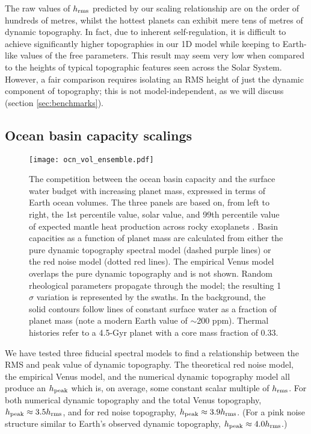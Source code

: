 The raw values of $h_{\rm rms}$ predicted by our scaling relationship are on the order of hundreds of metres, whilst the hottest planets can exhibit mere tens of metres of dynamic topography. In fact, due to inherent self-regulation, it is difficult to achieve significantly higher topographies in our 1D model while keeping to Earth-like values of the free parameters. This result may seem very low when compared to the heights of typical topographic features seen across the Solar System. However, a fair comparison requires isolating an RMS height of just the dynamic component of topography; this is not model-independent, as we will discuss (section \ref{sec:benchmarks}). 




\subsection{Ocean basin capacity scalings}
\label{sec:results-ocean}

\begin{figure}
    \centering
    \texttt{[image: ocn\_vol\_ensemble.pdf]}
    \caption[The competition between the ocean basin capacity and the surface water budget with increasing planet mass.]{The competition between the ocean basin capacity and the surface water budget with increasing planet mass, expressed in terms of Earth ocean volumes. The three panels are based on, from left to right, the 1st percentile value, solar value, and 99th percentile value of expected mantle heat production across rocky exoplanets \citep{nimmo_radiogenic_2020}. Basin capacities as a function of planet mass are calculated from either the pure dynamic topography spectral model (dashed purple lines) or the red noise model (dotted red lines). The empirical Venus model overlaps the pure dynamic topography and is not shown. Random rheological parameters propagate through the model; the resulting 1$\sigma$ variation is represented by the swaths. In the background, the solid contours follow lines of constant surface water as a fraction of planet mass (note a modern Earth value of $\sim$200 ppm). Thermal histories refer to a 4.5-Gyr planet with a core mass fraction of 0.33.}
    \label{fig:ocn-vol}
\end{figure}

We have tested three fiducial spectral models to find a relationship between the RMS and peak value of dynamic topography. The theoretical red noise model, the empirical Venus model, and the numerical dynamic topography model all produce an $h_{\rm peak}$ which is, on average, some constant scalar multiple of $h_{\rm rms}$. For both numerical dynamic topography and the total Venus topography, $h_{\rm peak} \approx 3.5 h_{\rm rms}$, and for red noise topography, $h_{\rm peak} \approx 3.9 h_{\rm rms}$. (For a pink noise structure similar to Earth's observed dynamic topography, $h_{\rm peak} \approx 4.0 h_{\rm rms}$.) 

